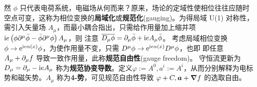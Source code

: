 然 $\phi$ 只代表电荷系统，电磁场从何而来？原来，场论的定域性使相位往往应随时空点可变，这称为相位变换的\textbf{局域化}或\textbf{规范化}(gauging)。为得局域 U(1) 对称性，需引入矢量场 $A_\mu$，而最小耦合指出，只需给作用量加上缩并项 $\mathrm{i} e\left(\phi\partial^\mu \bar{\phi}-\bar{\phi} \partial^\mu \phi \right) A_\mu$，则
注意 $\overline{D_\mu \phi}=\partial_\mu \bar\phi+\mathrm{i} e A_\mu \bar\phi$。
考虑局域相位变换 $\phi\to\mathrm{e}^{\mathrm{i} e\alpha(x)} \phi$，为使作用量不变，只需 $D^\mu\phi\to\mathrm{e}^{\mathrm{i} e\alpha(x)}D^\mu\phi$，也即
即任意 $A_\mu+\partial_\mu f$ 导致一致作用量，此称\textbf{规范自由性}(gauge freedom)。
守恒流更新为
$D_\mu=\partial_\mu -\mathrm{i} e A_\mu$ 称为\textbf{规范协变导数}。定义$\varphi:=A^0,a^i:=A^i$，从而分别解释为电标势和磁矢势。$A_\mu$ 称为\textbf{4-势}，可见规范自由性导致 $\varphi+C,\vb* a+\grad f$ 的选取自由。

